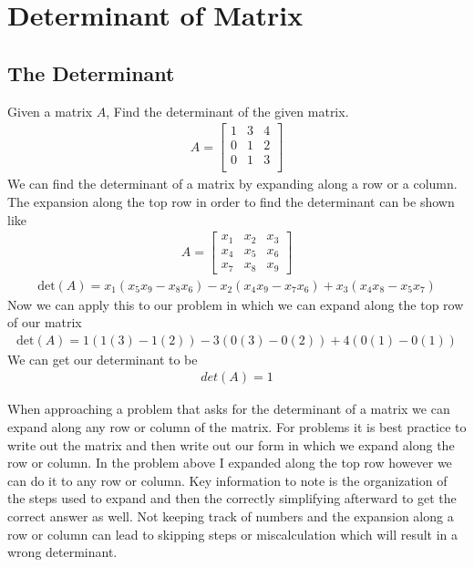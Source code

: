 \documentclass[12pt]{article}
\begin{document}
\section{Determinant of Matrix}
\subsection{The Determinant}
Given a matrix $A$, Find the determinant of the given matrix.
\newline
\begin{align*}
A = \begin{bmatrix}
  1 & 3 & 4 \\
  0 & 1 &2 \\
 0 & 1 & 3 \\
\end{bmatrix}
\end{align*}
We can find the determinant of a matrix by expanding along a row or a column. The expansion along the top row in order to find the determinant can be shown like
\begin{align*}
A = \begin{bmatrix}
x_{1} & x_{2} & x_{3} \\
  x_{4} & x_{5} & x_{6} \\
  x_{7} & x_{8} & x_{9}
\end{bmatrix}
\end{align*}
\begin{align*}
\text{det}(A) = x_{1} (x_{5}x_{9}-x_{8}x_{6})-x_{2} (x_{4}x_{9}-x_{7}x_{6})+x_{3} (x_{4}x_{8}-x_{5}x_{7})
\end{align*}
Now we can apply this to our problem in which we can expand along the top row of our matrix
\begin{align*}
\text{det}(A) = 1(1(3)-1(2))-3(0(3)-0(2))+4(0(1)-0(1))
\end{align*}
We can get our determinant to be
\begin{align*}
det(A) = 1
\end{align*}
\begin{flushleft}
When approaching a problem that asks for the determinant of a matrix we can expand along any row or column of the matrix. For problems it is best practice to write out the matrix and then write out our form in which we expand along the row or column. In the problem above I expanded along the top row however we can do it to any row or column. Key information to note is the organization of the steps used to expand and then the correctly simplifying afterward to get the correct answer as well. Not keeping track of numbers and the expansion  along a row or column can lead to skipping steps or miscalculation which will result in a wrong determinant.
\end{flushleft}
\newpage
\end{document}
